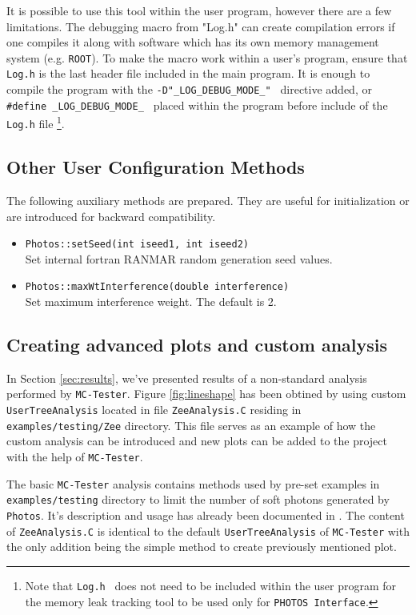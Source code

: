 \documentclass[]{Photos_interface_design}
\begin{document}
It is possible to use this tool within the user program, however there are a few limitations.
The debugging macro from "Log.h" can create compilation errors if one compiles
it along with software which has its own memory management system (e.g. {\tt ROOT}).
To make the macro work within a user's program, ensure that {\tt Log.h} is the last header file
included in the main program.
It is enough to  compile the program with the {\tt -D"\_LOG\_DEBUG\_MODE\_" } directive added,
or {\tt \#define \_LOG\_DEBUG\_MODE\_ } placed within the program before include
of the {\tt Log.h} file%
\footnote{Note that {\tt Log.h } does not need to be included within
the user program  for the memory leak tracking tool to be used only for {\tt PHOTOS Interface}.
}.

\subsection{Other User Configuration Methods}
\label{subsection:other_methods}

The following auxiliary methods are prepared. They are useful for initialization 
or are introduced for backward compatibility.

\begin{itemize}
  \item {\tt Photos::setSeed(int iseed1, int iseed2)} \\
        Set internal fortran RANMAR random generation seed values.
   \item {\tt Photos::maxWtInterference(double interference)} \\
        Set maximum interference weight. The default is 2.
\end{itemize}

\subsection{Creating advanced plots and custom analysis}
\label{App:Plots}

In Section \ref{sec:results}, we've presented results of a non-standard
analysis performed by {\tt MC-Tester}. Figure \ref{fig:lineshape} has been
obtined by using custom {\tt UserTreeAnalysis} located in file {\tt ZeeAnalysis.C}
residing in {\tt examples/testing/Zee} directory. This file serves as an
example of how the custom analysis can be introduced and new plots can be
added to the project with the help of {\tt MC-Tester}.

The basic {\tt MC-Tester} analysis contains methods used by pre-set examples
in {\tt examples/testing} directory to limit the number of soft photons generated
by {\tt Photos}. It's description and usage has already been documented in \cite{??}.
The content of {\tt ZeeAnalysis.C} is identical to the default {\tt UserTreeAnalysis}
of {\tt MC-Tester} with the only addition being the simple method to create
previously mentioned plot.
\end{document}
